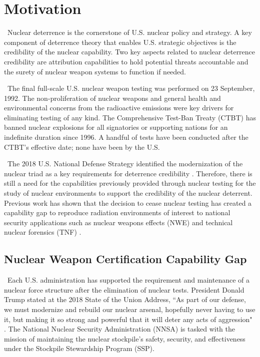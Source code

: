 
\section{Motivation}

\ Nuclear deterrence is the cornerstone of U.S. nuclear policy and strategy\cite{Defense2018}. A key component of deterrence theory that enables U.S. strategic objectives is the credibility of the nuclear capability. Two key aspects related to nuclear deterrence credibility are attribution capabilities to hold potential threats accountable and the surety of nuclear weapon systems to function if needed. 

\ The final full-scale U.S. nuclear weapon testing was performed on 23 September, 1992.  The non-proliferation of nuclear weapons and general health and environmental concerns from the radioactive emissions were key drivers for eliminating testing of any kind. The Comprehensive Test-Ban Treaty (CTBT) has banned nuclear explosions for all signatories or supporting nations for an indefinite duration since 1996. A handful of tests have been conducted after the CTBT's effective date; none have been by the U.S.  

\ The 2018 U.S. National Defense Strategy identified the modernization of the nuclear triad as a key requirements for deterrence credibility \cite{NDStrat2018}.
Therefore, there is still a need for the capabilities previously provided through nuclear testing for the study of nuclear environments to support the credibility of the nuclear deterrent.
Previous work has shown that the decision to cease nuclear testing has created a capability gap to reproduce radiation environments of interest to national security applications such as nuclear weapons effects (NWE) and technical nuclear forensics (TNF)  \cite{JointDefenseScienceBoard/ThreatReductionAdvisoryComitteeTaskForce2010, Bevins}. 

\subsection{Nuclear Weapon Certification Capability Gap}
\ Each U.S. administration has supported the requirement and maintenance of a nuclear force structure after the elimination of nuclear tests. President Donald Trump stated at the 2018 State of the Union Address, ``As part of our defense, we must modernize and rebuild our nuclear arsenal, hopefully never having to use it, but making it so strong and powerful that it will deter any acts of aggression" \cite{Trump2018}. The National Nuclear Security Administration (NNSA) is tasked with the mission of maintaining the nuclear stockpile's safety, security, and effectiveness under the Stockpile Stewardship Program (SSP). 

